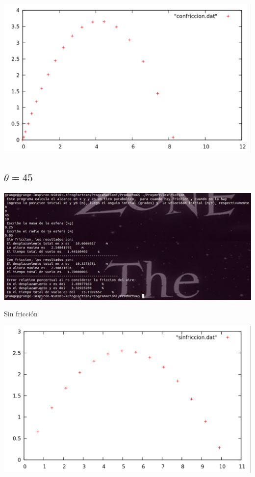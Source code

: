 \documentclass[notitlepage,12pt]{article}
\begin{document}
\includegraphics[scale=0.3]{theta_60_plot_friction}

\subsection{$\theta=45$}
\includegraphics[scale=0.4]{theta_45}


Sin fricci\'on

\includegraphics[scale=0.3]{theta_45_plot_nofriction}
\end{document}
